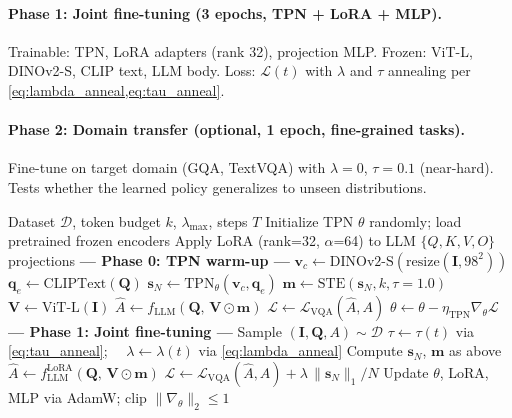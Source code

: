 \documentclass[12pt,a4paper]{article}
\newcommand{\vv}{\mathbf{v}}     %
\newcommand{\vq}{\mathbf{q}}     %
\newcommand{\vm}{\mathbf{m}}     %
\newcommand{\vs}{\mathbf{s}}     %
\newcommand{\mI}{\mathbf{I}}     %
\newcommand{\mQ}{\mathbf{Q}}     %
\newcommand{\mV}{\mathbf{V}}     %
\begin{document}
\paragraph{Phase 1: Joint fine-tuning (3 epochs, TPN + LoRA + MLP).}
Trainable: TPN, LoRA adapters (rank 32), projection MLP. Frozen: ViT-L,
DINOv2-S, CLIP text, LLM body. Loss: $\mathcal{L}(t)$ with $\lambda$ and $\tau$
annealing per \cref{eq:lambda_anneal,eq:tau_anneal}.

\paragraph{Phase 2: Domain transfer (optional, 1 epoch, fine-grained tasks).}
Fine-tune on target domain (GQA, TextVQA) with $\lambda = 0$, $\tau = 0.1$
(near-hard). Tests whether the learned policy generalizes to unseen distributions.

\begin{algorithm}[t]
\caption{TC-ViTok Training}
\label{alg:training}
\begin{algorithmic}[1]
\Require Dataset $\mathcal{D}$, token budget $k$, $\lambda_{\max}$, steps $T$
\State Initialize TPN $\theta$ randomly; load pretrained frozen encoders
\State Apply LoRA (rank=32, $\alpha$=64) to LLM $\{Q,K,V,O\}$ projections
\Statex \textbf{--- Phase 0: TPN warm-up ---}
  \For{$(\mI, \mQ, A)$ in $\mathcal{D}$}
    \State $\vv_c \leftarrow \mathrm{DINOv2\text{-}S}(\mathrm{resize}(\mI, 98^2))$
    \State $\vq_e \leftarrow \mathrm{CLIPText}(\mQ)$
    \State $\vs_N \leftarrow \mathrm{TPN}_\theta(\vv_c, \vq_e)$
    \State $\vm \leftarrow \mathrm{STE}(\vs_N, k, \tau{=}1.0)$
    \State $\mV \leftarrow \mathrm{ViT\text{-}L}(\mI)$
    \State $\hat{A} \leftarrow f_{\mathrm{LLM}}(\mQ,\, \mV \odot \vm)$ 
    \State $\mathcal{L} \leftarrow \mathcal{L}_{\mathrm{VQA}}(\hat{A}, A)$
    \State $\theta \leftarrow \theta - \eta_{\mathrm{TPN}} \nabla_\theta \mathcal{L}$
  \EndFor
\EndFor
\Statex \textbf{--- Phase 1: Joint fine-tuning ---}
  \State Sample $(\mI, \mQ, A) \sim \mathcal{D}$
  \State $\tau \leftarrow \tau(t)$ via \cref{eq:tau_anneal};
         $\quad \lambda \leftarrow \lambda(t)$ via \cref{eq:lambda_anneal}
  \State Compute $\vs_N$, $\vm$ as above
  \State $\hat{A} \leftarrow f_{\mathrm{LLM}}^{\mathrm{LoRA}}(\mQ,\, \mV \odot \vm)$
  \State $\mathcal{L} \leftarrow \mathcal{L}_{\mathrm{VQA}}(\hat{A}, A)
    + \lambda\,\|\vs_N\|_1 / N$
  \State Update $\theta$, LoRA, MLP via AdamW; clip $\|\nabla_\theta\|_2 \leq 1$
\EndFor
\end{algorithmic}
\end{algorithm}
\end{document}

